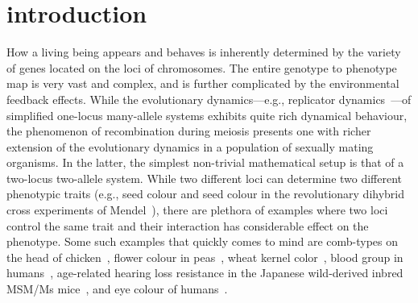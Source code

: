 \documentclass[
 pre,
 aps,
 a4paper,
 english,
 showkeys,
 reprint,
 twocolumn,
 superscriptaddress
]{revtex4}
\begin{document}
\section{introduction}
\label{sec:intro}
How a living being appears and behaves is inherently determined by the variety of genes located on the loci of chromosomes. The entire genotype to phenotype map is very vast and complex, and is further complicated by the environmental feedback effects. While the evolutionary dynamics---e.g., replicator dynamics~\cite{Taylor1978mathbio, Schuster1983jtb, Cressman2014, Mukhopadhyay2021chaos}---of simplified one-locus many-allele systems exhibits quite rich dynamical behaviour,  the phenomenon of recombination during meiosis presents one with richer extension of the evolutionary dynamics in a population of sexually mating organisms. In the latter, the simplest non-trivial mathematical setup is that of a two-locus two-allele system. While two different loci can determine two different phenotypic traits (e.g., seed colour and seed colour in the revolutionary dihybrid cross experiments of Mendel~\cite{o1993genetic, Mendel1866versuche}), there are plethora of examples where two loci control the same trait and their interaction has considerable effect on the phenotype. Some such examples that quickly comes to mind are comb-types on the head of chicken~\cite{Bateson1909springer}, flower colour in peas~\cite{Dooner1991arg}, wheat kernel color~\cite{carver2009book}, blood group in humans~\cite{dean2005book}, age-related hearing loss resistance in the Japanese wild-derived inbred MSM/Ms mice~\cite{Yasuda2022Biomedicines}, and eye colour of humans~\cite{2010WhiteJHG}.  
\end{document}
